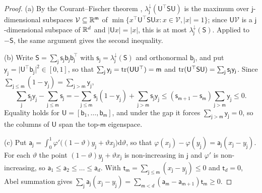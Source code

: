 \begin{proof}
(a) By the Courant--Fischer theorem \citep{horn2012matrix}, $\lambda^\downarrow_{\mathsf j}(\mathsf U^\top\mathsf S\mathsf U)$ is the maximum over $\mathsf j$-dimensional subspaces $\mathcal V\subseteq\mathbb{R}^{\mathsf m}$ of $\min\{x^\top\mathsf U^\top\mathsf S\mathsf Ux:x\in\mathcal V,\lvert x\rvert=1\}$; since $\mathsf U\mathcal V$ is a $\mathsf j$-dimensional subspace of $\mathbb{R}^d$ and $\lvert\mathsf Ux\rvert=\lvert x\rvert$, this is at most $\lambda^\downarrow_{\mathsf j}(\mathsf S)$. Applied to $-\mathsf S$, the same argument gives the second inequality.

(b) Write $\mathsf S=\sum_{\mathsf j}\mathsf s_{\mathsf j}\mathsf b_{\mathsf j}\mathsf b_{\mathsf j}^\top$ with $\mathsf s_{\mathsf j}=\lambda^\downarrow_{\mathsf j}(\mathsf S)$ and orthonormal $\mathsf b_{\mathsf j}$, and put $\mathsf y_{\mathsf j}=\lvert\mathsf U^\top\mathsf b_{\mathsf j}\rvert^2\in[0,1]$, so that $\sum_{\mathsf j}\mathsf y_{\mathsf j}=\operatorname{tr}(\mathsf U\mathsf U^\top)=\mathsf m$ and $\operatorname{tr}(\mathsf U^\top\mathsf S\mathsf U)=\sum_{\mathsf j}\mathsf s_{\mathsf j}\mathsf y_{\mathsf j}$. Since $\sum_{\mathsf j\le\mathsf m}(1-\mathsf y_{\mathsf j})=\sum_{\mathsf j>\mathsf m}\mathsf y_{\mathsf j}$,
\[
\sum_{\mathsf j}\mathsf s_{\mathsf j}\mathsf y_{\mathsf j}-\sum_{\mathsf j\le\mathsf m}\mathsf s_{\mathsf j}=-\sum_{\mathsf j\le\mathsf m}\mathsf s_{\mathsf j}(1-\mathsf y_{\mathsf j})+\sum_{\mathsf j>\mathsf m}\mathsf s_{\mathsf j}\mathsf y_{\mathsf j}\le(\mathsf s_{\mathsf m+1}-\mathsf s_{\mathsf m})\sum_{\mathsf j>\mathsf m}\mathsf y_{\mathsf j}\le0.
\]
Equality holds for $\mathsf U=[\mathsf b_1,\dots,\mathsf b_{\mathsf m}]$, and under the gap it forces $\sum_{\mathsf j>\mathsf m}\mathsf y_{\mathsf j}=0$, so the columns of $\mathsf U$ span the top-$\mathsf m$ eigenspace.

(c) Put $\mathsf a_{\mathsf j}=\int_0^1\varphi'\bigl((1-\vartheta)y_{\mathsf j}+\vartheta x_{\mathsf j}\bigr)\mathrm d\vartheta$, so that $\varphi(x_{\mathsf j})-\varphi(y_{\mathsf j})=\mathsf a_{\mathsf j}(x_{\mathsf j}-y_{\mathsf j})$. For each $\vartheta$ the point $(1-\vartheta)y_{\mathsf j}+\vartheta x_{\mathsf j}$ is non-increasing in $\mathsf j$ and $\varphi'$ is non-increasing, so $\mathsf a_1\le\mathsf a_2\le\dots\le\mathsf a_d$. With $\mathsf t_{\mathsf m}=\sum_{\mathsf j\le\mathsf m}(x_{\mathsf j}-y_{\mathsf j})\le0$ and $\mathsf t_d=0$, Abel summation gives $\sum_{\mathsf j}\mathsf a_{\mathsf j}(x_{\mathsf j}-y_{\mathsf j})=\sum_{\mathsf m<d}(\mathsf a_{\mathsf m}-\mathsf a_{\mathsf m+1})\mathsf t_{\mathsf m}\ge0$.


\end{proof}
